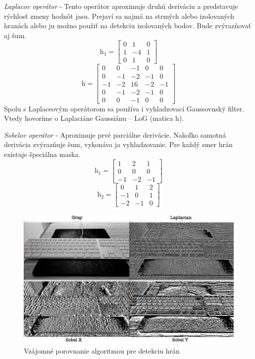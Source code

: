 \textit{Laplacov operátor} - Tento operátor aproximuje druhú deriváciu a predstavuje rýchlosť zmeny hodnôt jasu. Prejaví sa najmä na strmých alebo izolovaných hranách alebo ju možno použiť na detekciu izolovaných bodov. Bude zvýrazňovať aj šum.
$$\textit{h}_1=\begin{bmatrix} 0 & 1 & 0 \\ 1 & -4 & 1 \\ 0 & 1 & 0  \end{bmatrix}$$
$$\textit{h}=\begin{bmatrix} 0 & 0 & -1 & 0 & 0 \\ 0 & -1 & -2 & -1 & 0 \\ -1 & -2 & 16 & -2 & -1 \\ 0 & -1 & -2 & -1 & 0 \\ 0 & 0 & -1 & 0 & 0  \end{bmatrix}$$
Spolu s Laplaceovým operátorom sa používa i vyhladzovací Gaussovnský filter. Vtedy hovoríme o Laplaciáne Gaussiánu – LoG (matica h).

\textit{Sobelov operátor} - Aproximuje prvé parciálne derivácie. Nakoľko samotná derivácia zvýrazňuje šum, vykonáva ja vyhladzovanie. Pre každý smer hrán existuje špeciálna maska.
$$\textit{h}_1=\begin{bmatrix} 1 & 2 & 1 \\ 0 & 0 & 0 \\ -1 & -2 & -1  \end{bmatrix}$$
$$\textit{h}_2=\begin{bmatrix} 0 & 1 & 2 \\ -1 & 0 & 1 \\ -2 & -1 & 0  \end{bmatrix}$$

\begin{figure}[H]
\begin{center}
	\includegraphics[scale=0.16]{obrazky/hranove_filtre}
	\caption{Vzájomné porovnanie algoritmou pre detekciu hrán}
	\end{center}
\end{figure}


